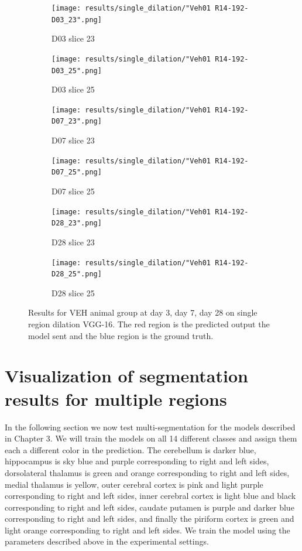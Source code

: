 \begin{figure}[!htb]  
    \centering %
\begin{subfigure}{0.35\textwidth}
  \texttt{[image: results/single\_dilation/"Veh01 R14-192-D03\_23".png]}
  \caption{D03 slice 23}
\end{subfigure}\hfil %
\begin{subfigure}{0.35\textwidth}
  \texttt{[image: results/single\_dilation/"Veh01 R14-192-D03\_25".png]}
  \caption{D03 slice 25}
\end{subfigure}

\medskip
\begin{subfigure}{0.35\textwidth}
  \texttt{[image: results/single\_dilation/"Veh01 R14-192-D07\_23".png]}
  \caption{D07 slice 23}
\end{subfigure}\hfil %
\begin{subfigure}{0.35\textwidth}
  \texttt{[image: results/single\_dilation/"Veh01 R14-192-D07\_25".png]}
  \caption{D07 slice 25}
\end{subfigure}

\medskip
\begin{subfigure}{0.35\textwidth}
  \texttt{[image: results/single\_dilation/"Veh01 R14-192-D28\_23".png]}
  \caption{D28 slice 23}
\end{subfigure}\hfil %
\begin{subfigure}{0.35\textwidth}
  \texttt{[image: results/single\_dilation/"Veh01 R14-192-D28\_25".png]}
  \caption{D28 slice 25}
\end{subfigure}
  
  \caption{Results for VEH animal group at day 3, day 7, day 28 on single region dilation VGG-16. The red region is the predicted output the model sent and the blue region is the ground truth. }
  \label{fig:results_single_dilation_VEH}
\end{figure}


\section{Visualization of segmentation results for multiple regions}
In the following section we now test multi-segmentation for the models described in Chapter 3. 
We will train the models on all 14 different classes and assign them each a different color in the prediction.
The cerebellum is darker blue, hippocampus is sky blue and purple corresponding to right and left sides, dorsolateral thalamus is green and orange corresponding to right and left sides, medial thalamus is yellow, outer cerebral cortex is pink and light purple corresponding to right and left sides, inner cerebral cortex is light blue and black corresponding to right and left sides, caudate putamen is purple and darker blue corresponding to right and left sides, and finally the piriform cortex is green and light orange corresponding to right and left sides.
We train the model using the parameters described above in the experimental settings.



